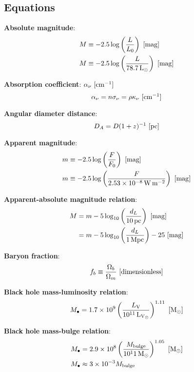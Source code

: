 \documentclass[a4paper,11pt]{article}
\begin{document}
\newpage
\subsection{Equations}

{\noindent}\textbf{Absolute magnitude}:
\begin{align*}
    M &\equiv -2.5\log\left(\frac{L}{L_0}\right) ~ [{\rm mag}] \\
    M &\equiv -2.5\log\left(\frac{L}{78.7\,{\rm L_\odot}}\right) ~ [{\rm mag}]
\end{align*}

{\noindent}\textbf{Absorption coefficient}: $\alpha_\nu ~ [{\rm cm^{-1}}]$
\begin{align*}
    \alpha_\nu = n\sigma_\nu = \rho\kappa_\nu ~ [{\rm cm^{-1}}]
\end{align*}

{\noindent}\textbf{Angular diameter distance}:
\begin{align*}
    D_A = D(1+z)^{-1} ~ [{\rm pc}]
\end{align*}

{\noindent}\textbf{Apparent magnitude}:
\begin{align*}
     m &\equiv -2.5\log\left(\frac{F}{F_0}\right) ~ [{\rm mag}] \\
     m &\equiv -2.5\log\left(\frac{F}{2.53\times10^{-8}\,{\rm W\,m^{-2}}}\right) ~ [{\rm mag}]
\end{align*}

{\noindent}\textbf{Apparent-absolute magnitude relation}:
\begin{align*}
    M &= m -5\log_{10}\left(\frac{d_L}{10\,{\rm pc}}\right) ~ [{\rm mag}] \\
      &= m -5\log_{10}\left(\frac{d_L}{1\,{\rm Mpc}}\right)-25 ~ [{\rm mag}]
\end{align*}

{\noindent}\textbf{Baryon fraction}:
\begin{align*}
    f_b \equiv \frac{\Omega_b}{\Omega_m} ~ [{\rm dimensionless}]
\end{align*}

{\noindent}\textbf{Black hole mass-luminosity relation}:
\begin{align*}
    M_\bullet = 1.7\times10^9\left(\frac{L_\mathrm{V}}{10^{11}\,{\rm L_{V_\odot}}}\right)^{1.11} ~ [{\rm M_\odot}]
\end{align*}

{\noindent}\textbf{Black hole mass-bulge relation}:
\begin{align*}
    M_\bullet &= 2.9\times10^8\left(\frac{M_\mathrm{bulge}}{10^11\,{\rm M_\odot}}\right)^{1.05} ~ [{\rm M_\odot}] \\
    M_\bullet &\approx 3\times10^{-3}M_\mathrm{bulge}
\end{align*}
\end{document}
